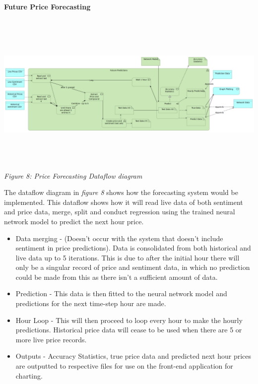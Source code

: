 \documentclass[oneside, 12pt]{article}
\begin{document}
		\textbf{Future Price Forecasting}
		\begin{center}
			\includegraphics[width=18cm,height=8cm]{images/Future_Predictions.png}
			\textit{Figure 8: Price Forecasting Dataflow diagram}
		\end{center}
		The dataflow diagram in \textit{figure 8} shows how the forecasting system would be implemented. This dataflow shows how it will read live data of both sentiment and price data, merge, split and conduct regression using the trained neural network model to predict the next hour price.
		\begin{itemize}
			 \item Data merging - (Doesn't occur with the system that doesn't include sentiment in price predictions). Data is consolidated from both historical and live data up to 5 iterations. This is due to after the initial hour there will only be a singular record of price and sentiment data, in which no prediction could be made from this as there isn't a sufficient amount of data.
			 \item Prediction - This data is then fitted to the neural network model and predictions for the next time-step hour are made.
			 \item Hour Loop - This will then proceed to loop every hour to make the hourly predictions. Historical price data will cease to be used when there are 5 or more live price records.
			 \item Outputs - Accuracy Statistics, true price data and predicted next hour prices are outputted to respective files for use on the front-end application for charting.
		\end{itemize}
	
\end{document}
